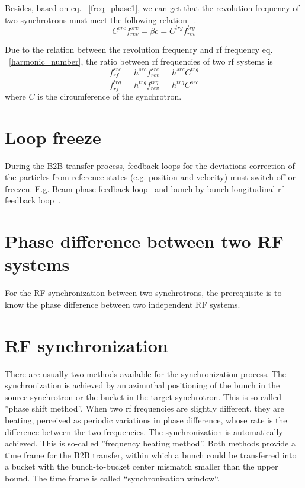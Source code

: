 Besides, based on eq. ~\ref{freq_phase1}, we can get that the revolution frequency of two synchrotrons must meet the following relation ~\cite{garoby_timing_1984}.
\begin{equation}
	C^{\mathit{src}}f_{rev}^{\mathit{src}} = \beta c=C^{\mathit{trg}}f_{rev}^{\mathit{trg}}
\end{equation}

Due to the relation between the revolution frequency and rf frequency eq. ~\ref{harmonic_number}, the ratio between rf frequencies of two rf systems is
\begin{equation}
	\frac{f_{rf}^{\mathit{src}}}{f_{rf}^{\mathit{trg}}}=\frac{h^{\mathit{src}}f_{rev}^{\mathit{src}}}{h^{\mathit{trg}}f_{rev}^{\mathit{trg}}}=\frac{h^{\mathit{src}}C^{\mathit{trg}}}{h^{\mathit{trg}}C^{\mathit{src}}}
\end{equation}
where $C$ is the circumference of the synchrotron.

\section{Loop freeze}

During the B2B transfer process, feedback loops for the deviations correction of the particles from reference states (e.g. position and velocity) must switch off or freezen. E.g. Beam phase feedback loop~\cite{grieser_beam_2015} and bunch-by-bunch longitudinal rf feedback loop~\cite{gross_bunch-by-bunch_2015}.

\section{Phase difference between two RF systems}
\label{sec:phase_diff}
For the RF synchronization between two synchrotrons, the prerequisite is to know the phase difference between two independent RF systems. 
  
\section{RF synchronization}
\label{two_sync_methods}

There are usually two methods available for the synchronization process. The synchronization is achieved by an azimuthal positioning of the bunch in the source synchrotron or the bucket in the target synchrotron. This is so-called ''phase shift method''. When two rf frequencies are slightly different, they are beating, perceived as periodic variations in phase difference, whose rate is the difference between the two frequencies. The synchronization is automatically achieved. This is so-called ''frequency beating method''. Both methods provide a time frame for the B2B transfer, within which a bunch could be transferred into a bucket with the bunch-to-bucket center mismatch smaller than the upper bound. The time frame is called ``synchronization window``. 

